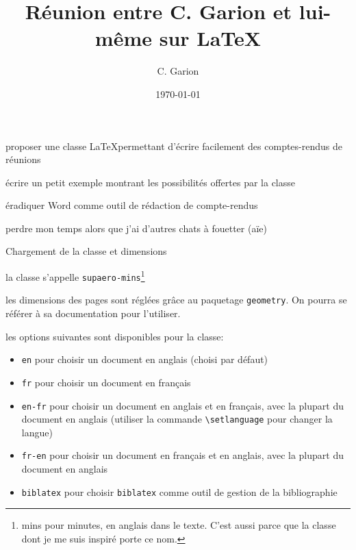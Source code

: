 \documentclass[fr,cr]{supaero-mins}
\begin{document}
\title{Réunion entre C. Garion et lui-même sur \LaTeX}
\author{C. Garion}
\date{\today}


\maketitle

\begin{objectifs}
\item proposer une classe \LaTeX permettant d'écrire facilement des
  comptes-rendus de réunions
\item écrire un petit exemple montrant les possibilités offertes par
  la classe
\item éradiquer Word comme outil de rédaction de compte-rendus
\item perdre mon temps alors que j'ai d'autres chats à fouetter (aïe)
\end{objectifs}

\begin{crlist}{Chargement de la classe et dimensions}
\item la classe s'appelle \texttt{supaero-mins}\footnote{mins pour
    minutes, en anglais dans le texte. C'est aussi parce que la classe
  dont je me suis inspiré porte ce nom.}
\item les dimensions des pages sont réglées grâce au paquetage
  \texttt{geometry}. On pourra se référer à sa documentation pour
  l'utiliser.
\item les options suivantes sont disponibles pour la classe:
  \begin{itemize}
  \item \verb!en! pour choisir un document en anglais (choisi par
    défaut)
  \item \verb!fr! pour choisir un document en français
  \item \verb!en-fr! pour choisir un document en anglais et en
    français, avec la plupart du document en anglais (utiliser la
    commande \verb!\setlanguage! pour changer la langue)
  \item \verb!fr-en! pour choisir un document en français et en
    anglais, avec la plupart du document en anglais
  \item \verb!biblatex! pour choisir \verb!biblatex! comme outil de
    gestion de la bibliographie
  \end{itemize}
\end{crlist}
\end{document}
